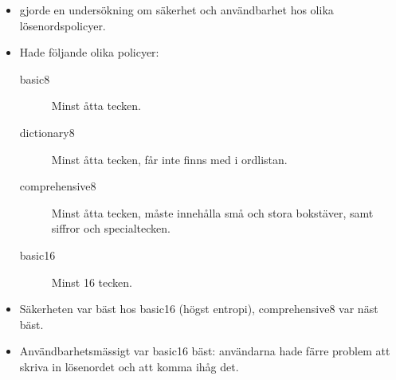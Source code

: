 \documentclass{beamer}
\begin{document}
\begin{frame}
  \begin{itemize}
    \item \citet{Komanduri2011opa} gjorde en undersökning om säkerhet och 
      användbarhet hos olika lösenordspolicyer.

      \pause{}

    \item Hade följande olika policyer:
      \begin{description}
        \item[basic8] Minst åtta tecken.

        \item[dictionary8] Minst åtta tecken, får inte finns med i ordlistan.

        \item[comprehensive8] Minst åtta tecken, måste innehålla små och stora 
          bokstäver, samt siffror och specialtecken.

        \item[basic16] Minst 16 tecken.
      \end{description}

      \pause{}

    \item Säkerheten var bäst hos basic16 (högst entropi), comprehensive8 var 
      näst bäst.

    \item Användbarhetsmässigt var basic16 bäst: användarna hade färre problem 
      att skriva in lösenordet och att komma ihåg det.
  \end{itemize}
\end{frame}
\end{document}
